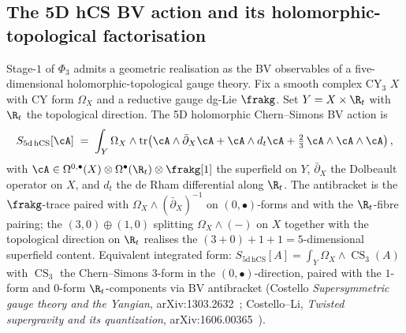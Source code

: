 \begin{remark}
\end{remark}

\subsection{The 5D hCS BV action and its holomorphic-topological factorisation}
\label{subsec:5d-hcs-bv-factorisation}

Stage-$1$ of $\Phi_3$ admits a geometric realisation as the BV observables of a five-dimensional holomorphic-topological gauge theory. Fix a smooth complex CY$_3$ $X$ with CY form $\Omega_X$ and a reductive gauge dg-Lie $\frakg$. Set $Y = X \times \R_t$ with $\R_t$ the topological direction. The 5D holomorphic Chern--Simons BV action is
\begin{equation}
\label{eq:5d-hcs-bv-action}
 S_{5\mathrm{d\,hCS}}[\cA] \;=\; \int_{Y} \Omega_X \wedge \operatorname{tr}\!\left(\cA \wedge \bar{\partial}_X \cA + \cA \wedge d_t \cA + \tfrac{2}{3}\, \cA \wedge \cA \wedge \cA\right),
\end{equation}
with $\cA \in \Omega^{0, \bullet}(X) \otimes \Omega^\bullet(\R_t) \otimes \frakg[1]$ the superfield on $Y$, $\bar{\partial}_X$ the Dolbeault operator on $X$, and $d_t$ the de Rham differential along $\R_t$. The antibracket is the $\frakg$-trace paired with $\Omega_X \wedge (\bar{\partial}_X)^{-1}$ on $(0, \bullet)$-forms and with the $\R_t$-fibre pairing; the $(3, 0) \oplus (1, 0)$ splitting $\Omega_X \wedge (-)$ on $X$ together with the topological direction on $\R_t$ realises the $(3 + 0) + 1 + 1 = 5$-dimensional superfield content. Equivalent integrated form: $S_{5\mathrm{d\,hCS}}[A] = \int_Y \Omega_X \wedge \operatorname{CS}_3(A)$ with $\operatorname{CS}_3$ the Chern--Simons $3$-form in the $(0, \bullet)$-direction, paired with the $1$-form and $0$-form $\R_t$-components via BV antibracket (Costello \emph{Supersymmetric gauge theory and the Yangian}, arXiv:1303.2632~\cite{Costello2013}; Costello--Li, \emph{Twisted supergravity and its quantization}, arXiv:1606.00365~\cite{CostelloLi2020}).

